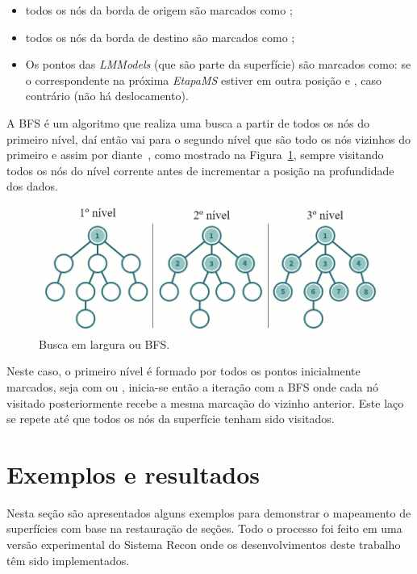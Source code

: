 \renewcommand{\labelitemi}{•}
\begin{itemize}
  \item todos os nós da borda de origem são marcados como ;
  \item todos os nós da borda de destino são marcados como ;
  \item Os pontos das \textit{LMModels} (que são parte da superfície) são marcados como:  se o correspondente na próxima \textit{EtapaMS} estiver em outra posição e , caso contrário (não há deslocamento).
\end{itemize}

A BFS é um algoritmo que realiza uma busca a partir de todos os nós do primeiro nível, daí então vai para o segundo nível que são todo os nós vizinhos do primeiro e assim por diante~\cite{Nilsson}, como mostrado na Figura~\ref{fig-bfs}, sempre visitando todos os nós do nível corrente antes de incrementar a posição na profundidade dos dados.

\begin{figure} [h]
  \begin{center}
    \includegraphics[width=350pt]{images/fig-bfs}
    \caption{Busca em largura ou BFS.~\cite{BFS}}\label{fig-bfs}
  \end{center}
\end{figure}

Neste caso, o primeiro nível é formado por todos os pontos inicialmente marcados, seja com  ou , inicia-se então a iteração com a BFS onde cada nó visitado posteriormente recebe a mesma marcação do vizinho anterior. Este laço se repete até que todos os nós da superfície tenham sido visitados.

\section{Exemplos e resultados}

Nesta seção são apresentados alguns exemplos para demonstrar o mapeamento de superfícies com base na restauração de seções. Todo o processo foi feito em uma versão experimental do Sistema Recon onde os desenvolvimentos deste trabalho têm sido implementados.

